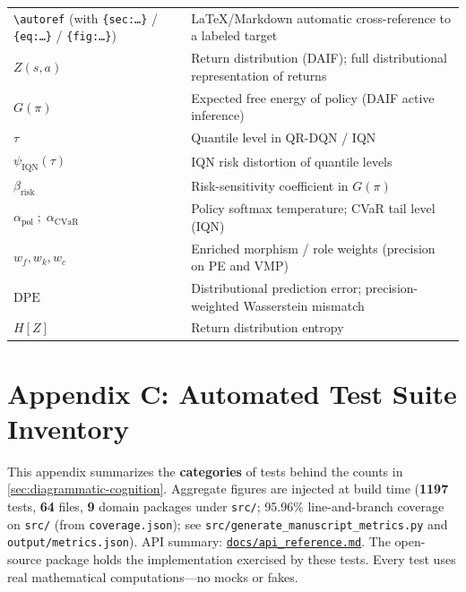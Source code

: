 \documentclass[
]{article}
\begin{document}
\begin{longtable}[]{@{}
  >{\raggedright\arraybackslash}p{}
  >{\raggedright\arraybackslash}p{}@{}}
\texttt{\textbackslash{}autoref} (with \texttt{\{sec:…\}} /
\texttt{\{eq:…\}} / \texttt{\{fig:…\}}) & LaTeX/Markdown automatic
cross-reference to a labeled target \\
\(Z(s,a)\) & Return distribution (DAIF); full distributional
representation of returns \\
\(G(\pi)\) & Expected free energy of policy (DAIF active inference) \\
\(\tau{}\) & Quantile level in QR-DQN / IQN \\
\(\psi_{\mathrm{IQN}}(\tau)\) & IQN risk distortion of quantile
levels \\
\(\beta_{\mathrm{risk}}\) & Risk-sensitivity coefficient in
\(G(\pi)\) \\
\(\alpha_{\mathrm{pol}} \;;\; \alpha_{\mathrm{CVaR}}\) & Policy softmax
temperature; CVaR tail level (IQN) \\
\(w_f, w_k, w_c\) & Enriched morphism / role weights (precision on PE
and VMP) \\
\(\mathrm{DPE}\) & Distributional prediction error; precision-weighted
Wasserstein mismatch \\
\(H[Z]\) & Return distribution entropy \\
\end{longtable}

\newpage

\section{Appendix C: Automated Test Suite
Inventory}\label{sec:test-suite-inventory}

This appendix summarizes the \textbf{categories} of tests behind the
counts in \autoref{sec:diagrammatic-cognition}. Aggregate figures are
injected at build time (\textbf{1197} tests, \textbf{64} files,
\textbf{9} domain packages under \texttt{src/}; 95.96\% line-and-branch
coverage on \texttt{src/} (from \texttt{coverage.json}); see
\texttt{src/generate\_manuscript\_metrics.py} and
\texttt{output/metrics.json}). API summary:
\href{../docs/api_reference.md\#manuscript-metrics-helper-srcgenerate_manuscript_metrics}{\texttt{docs/api\_reference.md}}.
The open-source package \citep{cognitive_case_diagrams2026code} holds
the implementation exercised by these tests. Every test uses real
mathematical computations---no mocks or fakes.
\end{document}

